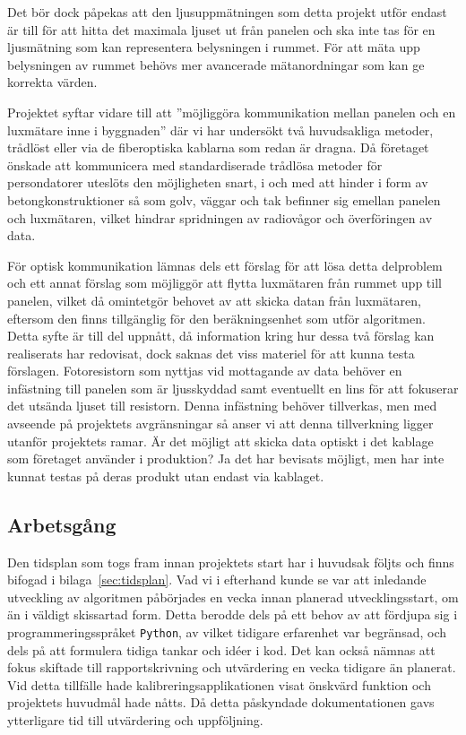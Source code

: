         Det bör dock påpekas att den ljusuppmätningen som detta projekt utför endast är till för att hitta det maximala ljuset ut från panelen och ska inte tas för en ljusmätning som kan representera belysningen i rummet. För att mäta upp belysningen av rummet behövs mer avancerade mätanordningar som kan ge korrekta värden.\bigskip

        Projektet syftar vidare till att ''möjliggöra kommunikation mellan panelen och en luxmätare inne i byggnaden'' där vi har undersökt två huvudsakliga metoder, trådlöst eller via de fiberoptiska kablarna som redan är dragna. Då företaget önskade att kommunicera med standardiserade trådlösa metoder för persondatorer uteslöts den möjligheten snart, i och med att hinder i form av betongkonstruktioner så som golv, väggar och tak befinner sig emellan panelen och luxmätaren, vilket hindrar spridningen av radiovågor och överföringen av data.\bigskip

        För optisk kommunikation lämnas dels ett förslag för att lösa detta delproblem och ett annat förslag som möjliggör att flytta luxmätaren från rummet upp till panelen, vilket då omintetgör behovet av att skicka datan från luxmätaren, eftersom den finns tillgänglig för den beräkningsenhet som utför algoritmen. Detta syfte är till del uppnått, då information kring hur dessa två förslag kan realiserats har redovisat, dock saknas det viss materiel för att kunna testa förslagen. Fotoresistorn som nyttjas vid mottagande av data behöver en infästning till panelen som är ljusskyddad samt eventuellt en lins för att fokuserar det utsända ljuset till resistorn. Denna infästning behöver tillverkas, men med avseende på projektets avgränsningar så anser vi att denna tillverkning ligger utanför projektets ramar. Är det möjligt att skicka data optiskt i det kablage som företaget använder i produktion? Ja det har bevisats möjligt, men har inte kunnat testas på deras produkt utan endast via kablaget.

    \subsection{Arbetsgång} %
    \label{sub:arbetsg_ng}
        Den tidsplan som togs fram innan projektets start har i huvudsak följts och finns bifogad i bilaga~\ref{sec:tidsplan}. Vad vi i efterhand kunde se var att inledande utveckling av algoritmen påbörjades en vecka innan planerad utvecklingsstart, om än i väldigt skissartad form. Detta berodde dels på ett behov av att fördjupa sig i programmeringsspråket \texttt{Python}, av vilket tidigare erfarenhet var begränsad, och dels på att formulera tidiga tankar och idéer i kod. Det kan också nämnas att fokus skiftade till rapportskrivning och utvärdering en vecka tidigare än planerat. Vid detta tillfälle hade kalibreringsapplikationen visat önskvärd funktion och projektets huvudmål hade nåtts. Då detta påskyndade dokumentationen gavs ytterligare tid till utvärdering och uppföljning.\bigskip

